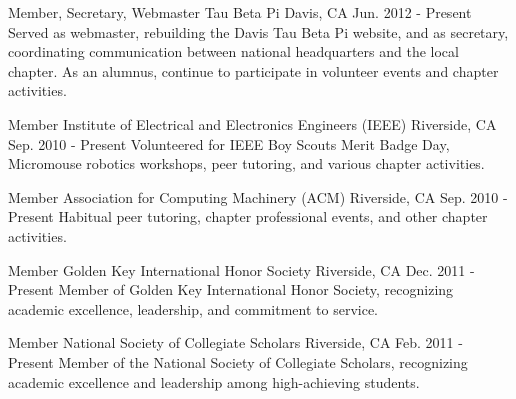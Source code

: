 

\begin{cventries}

\cventry
    {Member, Secretary, Webmaster} %
    {Tau Beta Pi} %
    {Davis, CA} %
    {Jun. 2012 - Present} %
    {Served as webmaster, rebuilding the Davis Tau Beta Pi website, and as secretary, coordinating communication between national headquarters and the local chapter. As an alumnus, continue to participate in volunteer events and chapter activities.} %
    {}

\cventry
    {Member} %
    {Institute of Electrical and Electronics Engineers (IEEE)} %
    {Riverside, CA} %
    {Sep. 2010 - Present} %
    {Volunteered for IEEE Boy Scouts Merit Badge Day, Micromouse robotics workshops, peer tutoring, and various chapter activities.} %
    {}

\cventry
    {Member} %
    {Association for Computing Machinery (ACM)} %
    {Riverside, CA} %
    {Sep. 2010 - Present} %
    {Habitual peer tutoring, chapter professional events, and other chapter activities.} %
    {}

\cventry
    {Member} %
    {Golden Key International Honor Society} %
    {Riverside, CA} %
    {Dec. 2011 - Present} %
    {Member of Golden Key International Honor Society, recognizing academic excellence, leadership, and commitment to service.} %
    {}

\cventry
    {Member} %
    {National Society of Collegiate Scholars} %
    {Riverside, CA} %
    {Feb. 2011 - Present} %
    {Member of the National Society of Collegiate Scholars, recognizing academic excellence and leadership among high-achieving students.} %
    {}

\end{cventries}